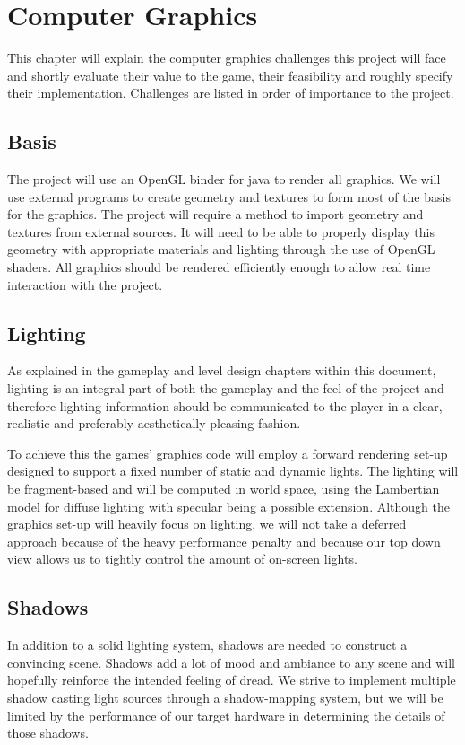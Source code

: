 \chapter{Computer Graphics}

This chapter will explain the computer graphics challenges this project will face and shortly evaluate their value to the game, their feasibility and roughly specify their implementation. Challenges are listed in order of importance to the project.

\section{Basis}
The project will use an OpenGL binder for java to render all graphics. We will use external programs to create geometry and textures to form most of the basis for the graphics. The project will require a method to import geometry and textures from external sources. It will need to be able to properly display this geometry with appropriate materials and lighting through the use of OpenGL shaders. All graphics should be rendered efficiently enough to allow real time interaction with the project. 

\section{Lighting}
As explained in the gameplay and level design chapters within this document, lighting is an integral part of both the gameplay and the feel of the project and therefore lighting information should be communicated to the player in a clear, realistic and preferably aesthetically pleasing fashion.

To achieve this the games' graphics code will employ a forward rendering set-up designed to support a fixed number of static and dynamic lights. The lighting will be fragment-based and will be computed in world space, using the Lambertian model for diffuse lighting with specular being a possible extension.
Although the graphics set-up will heavily focus on lighting, we will not take a deferred approach because of the heavy performance penalty and because our top down view allows us to tightly control the amount of on-screen lights.

\section{Shadows}
In addition to a solid lighting system, shadows are needed to construct a convincing scene. Shadows add a lot of mood and ambiance to any scene and will hopefully reinforce the intended feeling of dread. We strive to implement multiple shadow casting light sources through a shadow-mapping system, but we will be limited by the performance of our target hardware in determining the details of those shadows.

